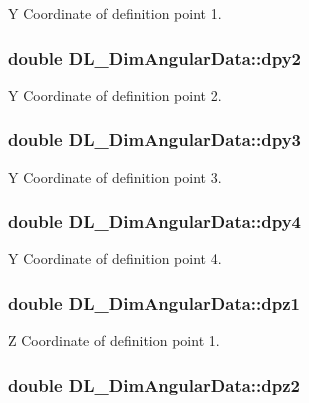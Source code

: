 Y Coordinate of definition point 1. \hypertarget{structDL__DimAngularData_a3277c810540be21c0015ebb70162b06a}{
\subsubsection[{dpy2}]{\setlength{\rightskip}{0pt plus 5cm}double D\-L\-\_\-\-Dim\-Angular\-Data\-::dpy2}}\label{structDL__DimAngularData_a3277c810540be21c0015ebb70162b06a}
Y Coordinate of definition point 2. \hypertarget{structDL__DimAngularData_a72afd10d24dfab7cac82c5bdbcf6f2f4}{
\subsubsection[{dpy3}]{\setlength{\rightskip}{0pt plus 5cm}double D\-L\-\_\-\-Dim\-Angular\-Data\-::dpy3}}\label{structDL__DimAngularData_a72afd10d24dfab7cac82c5bdbcf6f2f4}
Y Coordinate of definition point 3. \hypertarget{structDL__DimAngularData_af4f9ce6e4c38e7df538b6c0b5967b26c}{
\subsubsection[{dpy4}]{\setlength{\rightskip}{0pt plus 5cm}double D\-L\-\_\-\-Dim\-Angular\-Data\-::dpy4}}\label{structDL__DimAngularData_af4f9ce6e4c38e7df538b6c0b5967b26c}
Y Coordinate of definition point 4. \hypertarget{structDL__DimAngularData_ab3033b1ed4a4fb8d907a4fe32eeb8e2a}{
\subsubsection[{dpz1}]{\setlength{\rightskip}{0pt plus 5cm}double D\-L\-\_\-\-Dim\-Angular\-Data\-::dpz1}}\label{structDL__DimAngularData_ab3033b1ed4a4fb8d907a4fe32eeb8e2a}
Z Coordinate of definition point 1. \hypertarget{structDL__DimAngularData_a3451b1049a122c631705f5016278d8b7}{
\subsubsection[{dpz2}]{\setlength{\rightskip}{0pt plus 5cm}double D\-L\-\_\-\-Dim\-Angular\-Data\-::dpz2}}\label{structDL__DimAngularData_a3451b1049a122c631705f5016278d8b7}
